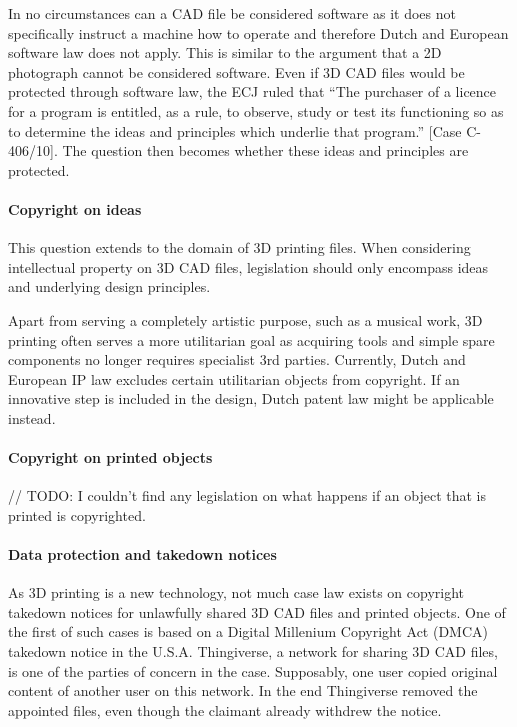 In no circumstances can a CAD file be considered software as it does not specifically instruct a machine how to operate and therefore Dutch and European software law does not apply. %
This is similar to the argument that a 2D photograph cannot be considered software. Even if 3D CAD files would be protected through software law, the ECJ ruled that “The purchaser of a licence for a program is entitled, as a rule, to observe, study or test its functioning so as to determine the ideas and principles which underlie that program.” [Case C-406/10]. The question then becomes whether these ideas and principles are protected.

\paragraph{Copyright on ideas}
This question extends to the domain of 3D printing files. When considering intellectual property on 3D CAD files, legislation should only encompass ideas and underlying design principles.

Apart from serving a completely artistic purpose, such as a musical work, 3D printing often serves a more utilitarian goal as acquiring tools and simple spare components no longer requires specialist 3rd parties. Currently, Dutch and European IP law excludes certain utilitarian objects from copyright.  %
If an innovative step is included in the design, Dutch patent law might be applicable instead. %

\paragraph{Copyright on printed objects}
// TODO: I couldn’t find any legislation on what happens if an object that is printed is copyrighted.

\paragraph{Data protection and takedown notices}
As 3D printing is a new technology, not much case law exists on copyright takedown notices for unlawfully shared 3D CAD files and printed objects. One of the first of such cases is based on a Digital Millenium Copyright Act (DMCA) takedown notice in the U.S.A. %
Thingiverse, a network for sharing 3D CAD files, is one of the parties of concern in the case. Supposably, one user copied original content of another user on this network. In the end Thingiverse removed the appointed files, even though the claimant already withdrew the notice. 

